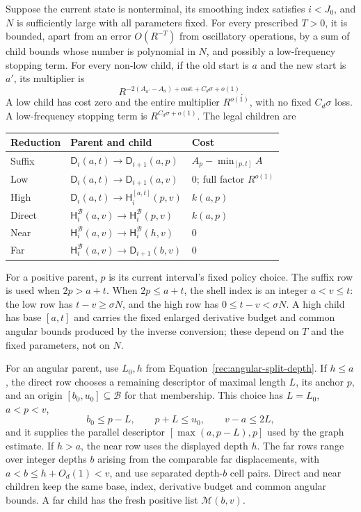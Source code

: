 \begin{proposition}\label{rec:reductions}
Suppose the current state is nonterminal, its smoothing index satisfies
$i<J_0$, and $N$ is sufficiently large with all parameters fixed.  For
every prescribed $T>0$, it is bounded, apart from an error $O(R^{-T})$
from oscillatory operations, by a sum of child bounds whose number is
polynomial in $N$, and possibly a low-frequency stopping term.  For every
non-low child,
if the old start is $a$ and the new start is $a'$, its multiplier is
\begin{equation}\label{rec:transition-factor}
 R^{-2(A_{a'}-A_a)+\mathrm{cost}+C_d\sigma+o(1)}.
\end{equation}
A low child has cost zero and the entire multiplier $R^{o(1)}$, with no
fixed $C_d\sigma$ loss.  A low-frequency stopping term is
$R^{C_d\sigma+o(1)}$.  The legal children are
\begin{center}
\renewcommand{\arraystretch}{1.2}
\begin{tabular}{lll}
Reduction & Parent and child & Cost \\ \hline
Suffix & $\mathsf D_i(a,t)\to\mathsf D_{i+1}(a,p)$
 & $A_p-\min_{[p,t]}A$ \\
Low & $\mathsf D_i(a,t)\to\mathsf D_{i+1}(a,v)$
 & $0$; full factor $R^{o(1)}$ \\
High & $\mathsf D_i(a,t)\to\mathsf H_i^{[a,t]}(p,v)$
 & $k(a,p)$ \\
Direct & $\mathsf H_i^{\mathcal B}(a,v)\to\mathsf H_i^{\mathcal B}(p,v)$
 & $k(a,p)$ \\
Near & $\mathsf H_i^{\mathcal B}(a,v)\to\mathsf H_i^{\mathcal B}(h,v)$
 & $0$ \\
Far & $\mathsf H_i^{\mathcal B}(a,v)\to\mathsf D_{i+1}(b,v)$
 & $0$
\end{tabular}
\end{center}

For a positive parent, $p$ is its current interval's fixed policy choice.
The suffix row is used when $2p>a+t$.  When $2p\le a+t$, the shell index
is an integer $a<v\le t$: the low row has $t-v\ge\sigma N$, and the high
row has $0\le t-v<\sigma N$.  A high child has base $[a,t]$ and carries
the fixed enlarged derivative budget and common angular bounds produced
by the inverse conversion; these depend on $T$ and the fixed parameters,
not on $N$.

For an angular parent, use $L_0,h$ from
Equation~\eqref{rec:angular-split-depth}.  If $h\le a$, the direct row
chooses a remaining descriptor of maximal length $L$, its anchor $p$,
and an origin $[b_0,u_0]\subseteq\mathcal B$ for that membership.  This
choice has $L=L_0$, $a<p<v$,
\[
 b_0\le p-L,\qquad p+L\le u_0,\qquad v-a\le2L,
\]
and it supplies the parallel descriptor $[\max(a,p-L),p]$ used by the
graph estimate.  If $h>a$, the near row uses the displayed depth $h$.
The far rows range over integer depths $b$ arising from the comparable
far displacements, with $a<b\le h+O_d(1)<v$, and use separated depth-$b$
cell pairs.  Direct and near children keep the same base, index,
derivative budget and common angular bounds.  A far child has the fresh
positive list $\mathcal M(b,v)$.


\end{proposition}
